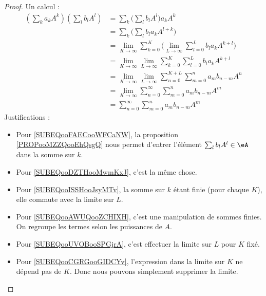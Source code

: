 \begin{proof}
	Un calcul :
	\begin{subequations}
		\begin{align}
			\left( \sum_ka_kA^k \right)\left( \sum_lb_lA^l \right) & =\sum_k\big( \sum_lb_lA^l \big)a_kA^k       \label{SUBEQooFAECooWFCaNW}                                           \\
			                                                       & = \sum_k\big( \sum_lb_la_kA^{l+k} \big)   \label{SUBEQooDZTHooMwmKxJ}                                             \\
			                                                       & = \lim_{K\to\infty} \sum_{k=0}^K\big( \lim_{L\to \infty} \sum_{l=0}^Lb_la_kA^{k+l} \big)                          \\
			                                                       & = \lim_{K\to \infty} \lim_{L\to \infty} \sum_{k=0}^K\sum_{l=0}^Lb_la_kA^{k+l}         \label{SUBEQooISSHooJsyMTv} \\
			                                                       & = \lim_{K\to \infty} \lim_{L\to \infty} \sum_{n=0}^{K+L}\sum_{m=0}^na_mb_{n-m}A^n     \label{SUBEQooAWUQooZCHIXH} \\
			                                                       & = \lim_{K\to \infty} \sum_{n=0}^{\infty}\sum_{m=0}^na_mb_{n-m}A^m                     \label{SUBEQooUVOBooSPGjrA} \\
			                                                       & = \sum_{n=0}^{\infty}\sum_{m=0}^na_mb_{n-m}A^m                                        \label{SUBEQooCGRGooGIDCYv}
		\end{align}
	\end{subequations}
	Justifications :
	\begin{itemize}
		\item Pour \eqref{SUBEQooFAECooWFCaNW}, la proposition \ref{PROPooMZZQooEhQsgQ} nous permet d'entrer l'élément \( \sum_lb_lA^l\in \eA\) dans la somme sur \( k\).
		\item
		      Pour \eqref{SUBEQooDZTHooMwmKxJ}, c'est la même chose.
		\item
		      Pour \eqref{SUBEQooISSHooJsyMTv}, la somme sur \( k\) étant finie (pour chaque \( K\)), elle commute avec la limite sur \( L\).
		\item
		      Pour \eqref{SUBEQooAWUQooZCHIXH}, c'est une manipulation de sommes finies. On regroupe les termes selon les puissances de \( A\).
		\item
		      Pour \eqref{SUBEQooUVOBooSPGjrA}, c'est effectuer la limite sur \( L\) pour \( K\) fixé.
		\item
		      Pour \eqref{SUBEQooCGRGooGIDCYv}, l'expression dans la limite sur \( K\) ne dépend pas de \( K\). Donc nous pouvons simplement supprimer la limite.
	\end{itemize}
\end{proof}



